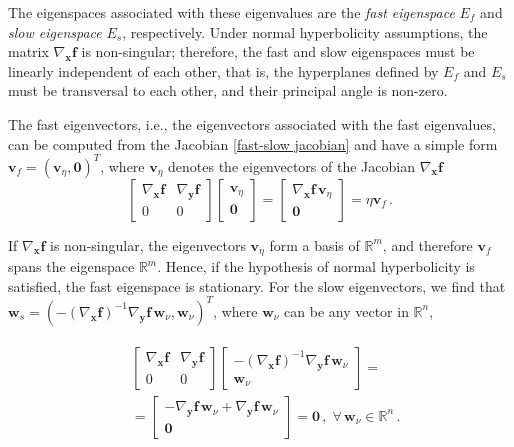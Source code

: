 \documentclass[aps,reprint,prx]{revtex4-2}
\begin{document}
The eigenspaces associated with these eigenvalues are the \textit{fast eigenspace} $E_f$ and \textit{slow eigenspace} $E_s$, respectively. Under normal hyperbolicity assumptions, the matrix $\nabla_\mathbf{x}\mathbf{f}$ is non-singular; therefore, the fast and slow eigenspaces must be linearly independent of each other, that is, the hyperplanes defined by $E_f$ and $E_s$ must be transversal to each other, and their principal angle is non-zero.

The fast eigenvectors, i.e., the eigenvectors associated with the fast eigenvalues, can be computed from the Jacobian \eqref{fast-slow jacobian} and have a simple form $\mathbf{v}_{f} = \left( \mathbf{v}_{\eta}, \mathbf{0}\right)^T$, where $\mathbf{v}_{\eta}$ denotes the eigenvectors of the Jacobian $\nabla_\mathbf{x} \mathbf{f}$
\begin{equation} 
\begin{bmatrix}
\nabla_\mathbf{x}\mathbf{f} & \nabla_\mathbf{y}\mathbf{f} \\
0 & 0
\end{bmatrix}  
\begin{bmatrix}
    \mathbf{v}_{\eta} \\
    \mathbf{0}
\end{bmatrix} = 
\begin{bmatrix}
    \nabla_\mathbf{x}\mathbf{f} \, \mathbf{v}_{\eta} \\
    \mathbf{0}
\end{bmatrix} = \eta \mathbf{v}_{f}\, .
\end{equation} \label{eq: fast_eigenvec}

If $\nabla_\mathbf{x} \mathbf{f}$ is non-singular, the eigenvectors $\mathbf{v}_{\eta}$ form a basis of $\mathbb{R}^m$, and therefore $\mathbf{v}_{f}$ spans the eigenspace $\mathbb{R}^m$. Hence, if the hypothesis of normal hyperbolicity is satisfied, the fast eigenspace is stationary. For the slow eigenvectors, we find that $\mathbf{w}_{s} = \left(- (\nabla_\mathbf{x}\mathbf{f})^{-1}\nabla_\mathbf{y}\mathbf{f} \,\mathbf{w}_{\nu}, \mathbf{w}_{\nu} \right)^T$, where $\mathbf{w}_{\nu}$ can be any vector in $\mathbb{R}^n$,

\begin{align} \label{fast kernel}
\begin{aligned}
&\begin{bmatrix}
\nabla_\mathbf{x}\mathbf{f} & \nabla_\mathbf{y}\mathbf{f} \\
0 & 0
\end{bmatrix}  
\begin{bmatrix}
    - (\nabla_\mathbf{x}\mathbf{f})^{-1}\nabla_\mathbf{y}\mathbf{f} \,\mathbf{w}_{\nu} \\
    \mathbf{w}_{\nu}
\end{bmatrix} 
= \\
&=\begin{bmatrix}
    -\nabla_\mathbf{y}\mathbf{f} \, \mathbf{w}_{\nu} + \nabla_\mathbf{y}\mathbf{f} \, \mathbf{w}_{\nu} \\
    \mathbf{0}
\end{bmatrix} = \mathbf{0} \, , \; \forall \, \mathbf{w}_{\nu} \in \mathbb{R}^n \, .
\end{aligned}
\end{align}
\end{document}
